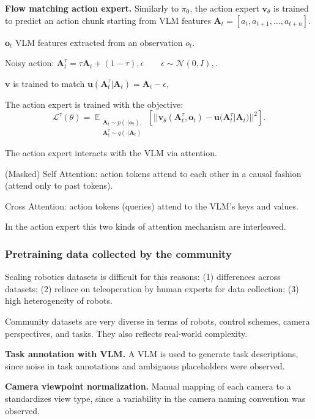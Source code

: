 \textbf{Flow matching action expert.} Similarly to $\pi_0$, the action expert $\mathbf{v}_\theta$ is trained to predict an action chunk starting from VLM features $\mathbf{A}_t = [a_t,a_{t+1},\ldots,a_{t+n}]$.
\begin{dashlist}
    \item $\mathbf{o}_t$ VLM features extracted from an observation $o_t$.
    \item Noisy action: $\mathbf{A} _t^\tau=\tau \mathbf{A}_t+(1-\tau),\epsilon\qquad
    \epsilon\sim\mathcal{N}(0,I),$.
    \item $\mathbf{v}$ is trained to match
    $\mathbf{u}(\mathbf{A}_t^\tau|\mathbf{A}_t) = 
        \mathbf{A}_t-\epsilon,$
    \item The action expert is trained with the objective:
    \[
    \mathcal{L}^\tau(\theta)=
    \mathop{\mathbb{E}}_{\substack{\mathbf{A}_t \sim p(\cdot|\mathbf{o}_t), \\
                        \mathbf{A}_t^\tau \sim q(\cdot|\mathbf{A}_t)}} 
    [|| \mathbf{v}_\theta(\mathbf{A}_t^\tau,\mathbf{o}_t) - \mathbf{u}(\mathbf{A}_t^\tau|\mathbf{A}_t) ||^2].
    \]
\end{dashlist}

The action expert interacts with the VLM via attention. 
\begin{dashlist}
    \item (Masked) Self Attention: action tokens attend to each other in a causal fashion (attend only to past tokens).
    \item Cross Attention: action tokens (queries) attend to the VLM's keys and values.
\end{dashlist}
In the action expert this two kinds of attention mechanism are interleaved.

\subsubsection{Pretraining data collected by the community}
\begin{dashlist}
    \item Scaling robotics datasets is difficult for this reasons: (1) differences across datasets; (2) reliace on teleoperation by human experts for data collection; (3) high heterogeneity of robots.
    \item Community datasets are very diverse in terms of robots, control schemes, camera perspectives, and tasks. They also reflects real-world complexity.
    \item \textbf{Task annotation with VLM.} A VLM is used to generate task descriptions, since noise in task annotations and ambiguous placeholders were observed.
    \item \textbf{Camera viewpoint normalization.} Manual mapping of each camera to a standardizes view type, since a variability in the camera naming convention was observed.
\end{dashlist}

